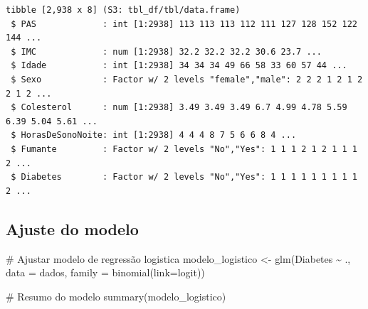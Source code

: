 \documentclass[
  letterpaper,
  DIV=11,
  numbers=noendperiod]{scrartcl}
\newenvironment{Shaded}{\begin{snugshade}}{\end{snugshade}}
\newcommand{\AttributeTok}[1]{\textcolor[rgb]{0.40,0.45,0.13}{#1}}
\newcommand{\CommentTok}[1]{\textcolor[rgb]{0.37,0.37,0.37}{#1}}
\newcommand{\FunctionTok}[1]{\textcolor[rgb]{0.28,0.35,0.67}{#1}}
\newcommand{\NormalTok}[1]{\textcolor[rgb]{0.00,0.23,0.31}{#1}}
\newcommand{\OtherTok}[1]{\textcolor[rgb]{0.00,0.23,0.31}{#1}}
\newcommand{\SpecialCharTok}[1]{\textcolor[rgb]{0.37,0.37,0.37}{#1}}
\newcommand{\StringTok}[1]{\textcolor[rgb]{0.13,0.47,0.30}{#1}}
\begin{document}
\begin{Shaded}
\end{Shaded}

\begin{verbatim}
tibble [2,938 x 8] (S3: tbl_df/tbl/data.frame)
 $ PAS             : int [1:2938] 113 113 113 112 111 127 128 152 122 144 ...
 $ IMC             : num [1:2938] 32.2 32.2 32.2 30.6 23.7 ...
 $ Idade           : int [1:2938] 34 34 34 49 66 58 33 60 57 44 ...
 $ Sexo            : Factor w/ 2 levels "female","male": 2 2 2 1 2 1 2 2 1 2 ...
 $ Colesterol      : num [1:2938] 3.49 3.49 3.49 6.7 4.99 4.78 5.59 6.39 5.04 5.61 ...
 $ HorasDeSonoNoite: int [1:2938] 4 4 4 8 7 5 6 6 8 4 ...
 $ Fumante         : Factor w/ 2 levels "No","Yes": 1 1 1 2 1 2 1 1 1 2 ...
 $ Diabetes        : Factor w/ 2 levels "No","Yes": 1 1 1 1 1 1 1 1 1 2 ...
\end{verbatim}

\subsection{Ajuste do modelo}\label{ajuste-do-modelo-1}

\begin{Shaded}
\begin{Highlighting}[]
\CommentTok{\# Ajustar modelo de regressão logistica}
\NormalTok{modelo\_logistico }\OtherTok{\textless{}{-}} \FunctionTok{glm}\NormalTok{(Diabetes }\SpecialCharTok{\textasciitilde{}}\NormalTok{ ., }\AttributeTok{data =}\NormalTok{ dados, }\AttributeTok{family =} \FunctionTok{binomial}\NormalTok{(}\AttributeTok{link=}\StringTok{\textquotesingle{}logit\textquotesingle{}}\NormalTok{))}

\CommentTok{\# Resumo do modelo}
\FunctionTok{summary}\NormalTok{(modelo\_logistico)}
\end{Highlighting}
\end{Shaded}
\end{document}
